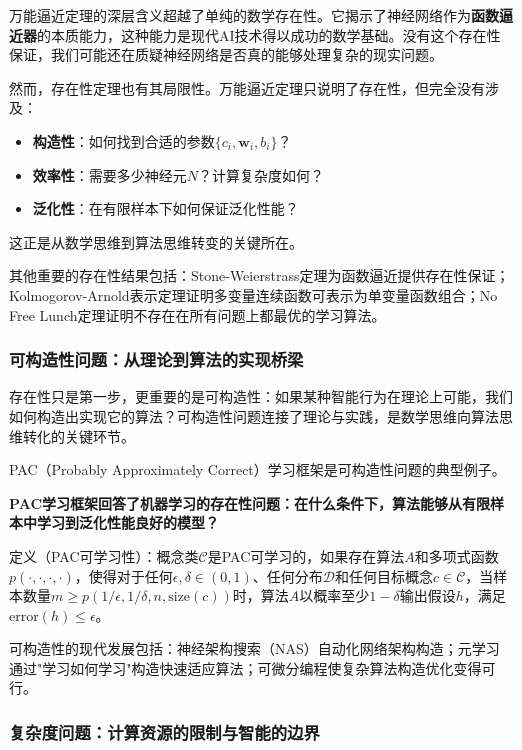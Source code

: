 万能逼近定理的深层含义超越了单纯的数学存在性。它揭示了神经网络作为\textbf{函数逼近器}的本质能力，这种能力是现代AI技术得以成功的数学基础。没有这个存在性保证，我们可能还在质疑神经网络是否真的能够处理复杂的现实问题。

然而，存在性定理也有其局限性。万能逼近定理只说明了存在性，但完全没有涉及：
\begin{itemize}
\item \textbf{构造性}：如何找到合适的参数$\{c_i, \mathbf{w}_i, b_i\}$？
\item \textbf{效率性}：需要多少神经元$N$？计算复杂度如何？
\item \textbf{泛化性}：在有限样本下如何保证泛化性能？
\end{itemize}

这正是从数学思维到算法思维转变的关键所在。

其他重要的存在性结果包括：Stone-Weierstrass定理为函数逼近提供存在性保证；Kolmogorov-Arnold表示定理证明多变量连续函数可表示为单变量函数组合；No Free Lunch定理证明不存在在所有问题上都最优的学习算法。

\subsubsection{可构造性问题：从理论到算法的实现桥梁}

存在性只是第一步，更重要的是可构造性：如果某种智能行为在理论上可能，我们如何构造出实现它的算法？可构造性问题连接了理论与实践，是数学思维向算法思维转化的关键环节。

PAC（Probably Approximately Correct）学习框架是可构造性问题的典型例子。

\textbf{PAC学习框架回答了机器学习的存在性问题：在什么条件下，算法能够从有限样本中学习到泛化性能良好的模型？}

定义（PAC可学习性）：概念类$\mathcal{C}$是PAC可学习的，如果存在算法$A$和多项式函数$p(\cdot, \cdot, \cdot, \cdot)$，使得对于任何$\epsilon, \delta \in (0,1)$、任何分布$\mathcal{D}$和任何目标概念$c \in \mathcal{C}$，当样本数量$m \geq p(1/\epsilon, 1/\delta, n, \text{size}(c))$时，算法$A$以概率至少$1-\delta$输出假设$h$，满足$\text{error}(h) \leq \epsilon$。

可构造性的现代发展包括：神经架构搜索（NAS）自动化网络架构构造；元学习通过"学习如何学习"构造快速适应算法；可微分编程使复杂算法构造优化变得可行。

\subsubsection{复杂度问题：计算资源的限制与智能的边界}

